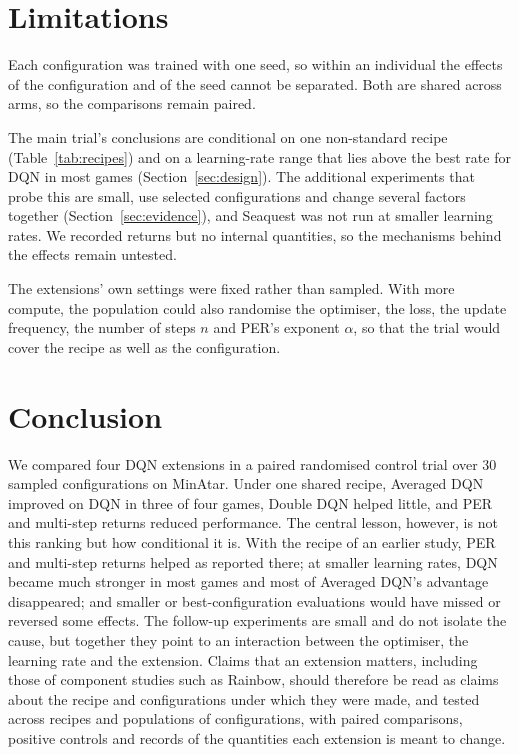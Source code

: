 \documentclass[conference,a4paper]{IEEEtran}
\begin{document}
\section{Limitations}\label{sec:limitations}
Each configuration was trained with one seed, so within an individual the effects of the configuration and of the seed
cannot be separated. Both are shared across arms, so the comparisons remain paired.

The main trial's conclusions are conditional on one non-standard recipe (Table~\ref{tab:recipes}) and on a
learning-rate range that lies above the best rate for DQN in most games (Section~\ref{sec:design}). The additional
experiments that probe this are small, use selected configurations and change several factors together
(Section~\ref{sec:evidence}), and Seaquest was not run at smaller learning rates. We recorded returns but no internal
quantities, so the mechanisms behind the effects remain untested.

The extensions' own settings were fixed rather than sampled. With more compute, the population could also randomise the
optimiser, the loss, the update frequency, the number of steps $n$ and PER's exponent $\alpha$, so that the trial would
cover the recipe as well as the configuration.

\section{Conclusion}\label{sec:conclusion}
We compared four DQN extensions in a paired randomised control trial over 30 sampled configurations on MinAtar.
Under one shared recipe, Averaged DQN improved on DQN in three of four games, Double DQN helped little, and PER and
multi-step returns reduced performance. The central lesson, however, is not this ranking but how conditional it is.
With the recipe of an earlier study, PER and multi-step returns helped as reported there; at smaller learning rates,
DQN became much stronger in most games and most of Averaged DQN's advantage disappeared; and smaller or best-configuration
evaluations would have missed or reversed some effects. The follow-up experiments are small and do not isolate the
cause, but together they point to an interaction between the optimiser, the learning rate and the extension. Claims
that an extension matters, including those of component studies such as Rainbow, should therefore be read as claims
about the recipe and configurations under which they were made, and tested across recipes and populations of
configurations, with paired comparisons, positive controls and records of the quantities each extension is meant to
change.
\end{document}
